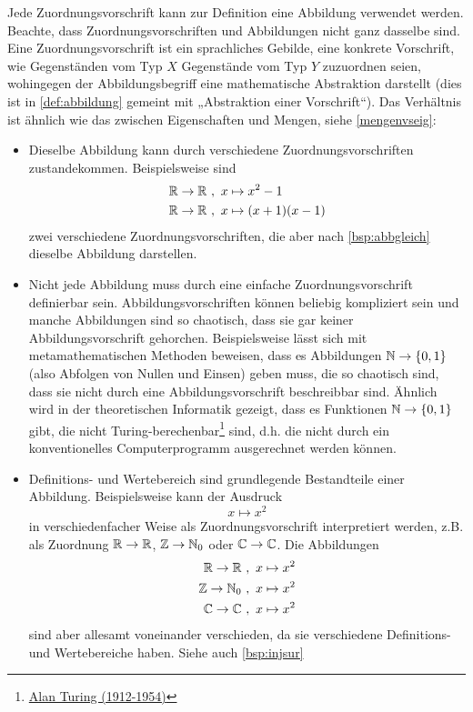 \begin{bem} \label{zuordvsabb}
    Jede Zuordnungsvorschrift kann zur Definition eine Abbildung verwendet werden. Beachte, dass Zuordnungsvorschriften und Abbildungen nicht ganz dasselbe sind. Eine Zuordnungsvorschrift ist ein sprachliches Gebilde, eine konkrete Vorschrift, wie Gegenständen vom Typ $X$ Gegenstände vom Typ $Y$ zuzuordnen seien, wohingegen der Abbildungsbegriff eine mathematische Abstraktion darstellt (dies ist in \cref{def:abbildung} gemeint mit „Abstraktion einer Vorschrift“). Das Verhältnis ist ähnlich wie das zwischen Eigenschaften und Mengen, siehe \cref{mengenvseig}:
    \begin{itemize}
        \item Dieselbe Abbildung kann durch verschiedene Zuordnungsvorschriften zustandekommen. Beispielsweise sind
        \begin{align*}
            \mathbb R \to \mathbb R \ &,\ x\mapsto x^2-1 \\
            \mathbb R \to \mathbb R \ &,\ x\mapsto (x+1)(x-1)
        \end{align*}
        zwei verschiedene Zuordnungsvorschriften, die aber nach \cref{bsp:abbgleich} dieselbe Abbildung darstellen.
        \item Nicht jede Abbildung muss durch eine einfache Zuordnungsvorschrift definierbar sein. Abbildungsvorschriften können beliebig kompliziert sein und manche Abbildungen sind so chaotisch, dass sie gar keiner Abbildungsvorschrift gehorchen. Beispielsweise lässt sich mit metamathematischen Methoden beweisen, dass es Abbildungen $\mathbb N \to \{0,1\}$ (also Abfolgen von Nullen und Einsen) geben muss, die so chaotisch sind, dass sie nicht durch eine Abbildungsvorschrift beschreibbar sind. Ähnlich wird in der theoretischen Informatik gezeigt, dass es Funktionen $\mathbb N\to \{0,1\}$ gibt, die nicht Turing-berechenbar\footnote{\href{https://de.wikipedia.org/wiki/Alan_Turing}{Alan Turing (1912-1954)}} sind, d.h. die nicht durch ein konventionelles Computerprogramm ausgerechnet werden können.
        \item Definitions- und Wertebereich sind grundlegende Bestandteile einer Abbildung. Beispielsweise kann der Ausdruck
            \[ x\mapsto x^2 \]
        in verschiedenfacher Weise als Zuordnungsvorschrift interpretiert werden, z.B. als Zuordnung $\mathbb R\to \mathbb R$, $\mathbb Z\to \mathbb N_0$ oder $\mathbb C\to \mathbb C$. Die Abbildungen
        \begin{align*}
            \mathbb R \to \mathbb R \ & ,\ x\mapsto x^2 \\
            \mathbb Z \to \mathbb N_0 \ & ,\ x\mapsto x^2 \\
            \mathbb C \to \mathbb C \ &,\ x\mapsto x^2 
        \end{align*}
        sind aber allesamt voneinander verschieden, da sie verschiedene Definitions- und Wertebereiche haben. Siehe auch \cref{bsp:injsur}
    \end{itemize}
\end{bem}


